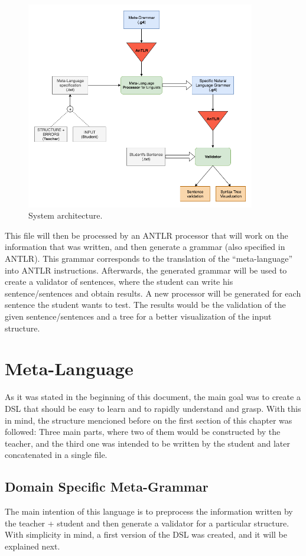 \begin{figure}[h]
    \centering
    \includegraphics[width=10cm]{images/msc_system_architecture.png}
    \caption{System architecture.}
    \label{fig:system_architecture}
\end{figure}

This file will then be processed by an \textsc{ANTLR} processor that will work on the information that was written, and then generate a grammar (also specified in \textsc{ANTLR}). 
This grammar corresponds to the translation of the ``meta-language'' into \textsc{ANTLR} instructions. 
Afterwards, the generated grammar will be used to create a validator of sentences, where the student can write his sentence/sentences and obtain results.
A new processor will be generated for each sentence the student wants to test.
The results would be the validation of the given sentence/sentences and a tree for a better visualization of the input structure.


\section{Meta-Language}
As it was stated in the beginning of this document, the main goal was to create a \textsc{DSL} that should be easy to learn and to rapidly understand and grasp. With this in mind, the structure mencioned before on the first section
of this chapter was followed: Three main parts, where two of them would be constructed by the teacher, and the third one was intended to be written by the student and later concatenated in a single file.

\subsection{Domain Specific Meta-Grammar}
The main intention of this language is to preprocess the information written by the teacher + student and then generate a validator for a particular structure. With simplicity in mind, a first version of the \textsc{DSL} was created, and it will be explained next.

